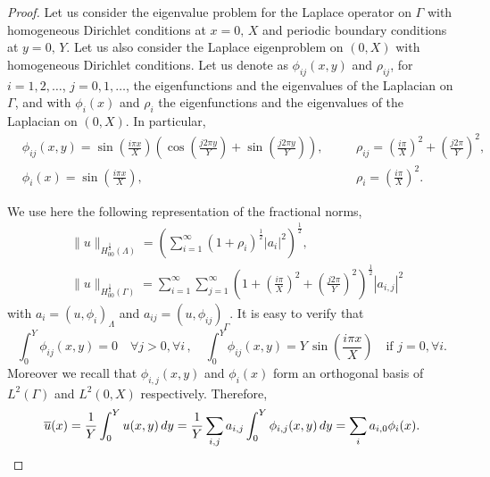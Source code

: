 \begin{proof}
Let us consider the eigenvalue problem for the Laplace operator on $\Gamma$ with homogeneous Dirichlet conditions at $x=0,\, X$ and periodic boundary conditions at $y=0,\, Y$. Let us also consider the Laplace eigenproblem on $(0,X)$ with homogeneous Dirichlet conditions. Let us denote as $\phi _{ij}(x,y)$ and $\rho _{ij}$, for $i=1,2,\dots$, $j=0,1,\dots$, the eigenfunctions and the eigenvalues of the Laplacian on $\Gamma$, and with $\phi _i(x)$ and $\rho _i$ the eigenfunctions and the eigenvalues of the Laplacian on $(0,X)$. In particular,
\begin{align*}
&\phi _{ij}(x,y)=\sin \left(\frac{i\pi x}{X}\right)\left( \cos\left(\frac{j2\pi y}{Y}\right)+ \sin\left(\frac{j2\pi y}{Y}\right) \right),\quad
&&\rho_{ij}=\left(\frac{i\pi}{X}\right) ^2+\left(\frac{j2\pi}{Y}\right)^2,
\\
&\phi _{i}(x)=\sin \left(\frac{i\pi x}{X}\right),\quad
&&\rho _i = \left(\frac{i\pi}{X}\right) ^2.
\end{align*}

We use here the following representation of the fractional norms, 
\begin{equation}\label{eq:fracnorm_lambda}
\begin{aligned}
&\|u\|_{H^{\frac 12}_{00}(\Lambda)}=\left(\sum_{i=1}^{\infty} \left( 1+ \rho_{i}\right)^{\frac 12}|a_i|^2\right)^{\frac 12},\\
&\|u\|_{H^{\frac 12}_{00}(\Gamma)}=
\sum_{i=1}^{\infty} \sum_{j=1}^{\infty}  \left( 1+ \left(\frac{i\pi}{X}\right)^2 
+ \left(\frac{j2\pi}{Y}\right)^2\right)^{\frac 12} |a_{i,j}|^2
\end{aligned}
\end{equation} 
with $a_i=\left(u, \phi _i \right)_{\Lambda}$ and $a_{ij}=\left( u, \phi_{ij}\right)_{\Gamma}$.
It is easy to verify that 
\begin{equation}\label{int_eigenf}
\int_0^{Y} \phi _{ij}(x,y)=0 \quad \forall j>0, \forall i\,,
\quad
\int_0^{Y} \phi _{ij}(x,y)= Y \, \sin\left(\frac{i\pi x}{X}\right) \quad \mbox{if } j=0, \forall i  .
\end{equation}
Moreover we recall that $\phi_{i,j}(x,y)$ and $\phi _i(x)$ form an orthogonal basis of $L^2(\Gamma)$ and $L^2(0,X)$ respectively. Therefore,
\begin{equation*}
\overline{u}(x)=\frac{1}{Y}\int_0^{Y} u(x,y)\, dy
= \frac{1}{Y}\sum_{i,j} a_{i,j}\int_0^{Y}  \phi_{i,j}(x,y) \, dy
=  \sum_{i} a_{i,0} \phi_{i}(x).
\end{equation*}


\end{proof}
